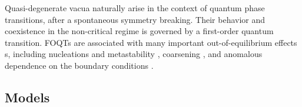 Quasi-degenerate vacua naturally arise in the context of quantum phase transitions, after a spontaneous symmetry breaking. Their behavior and coexistence in the non-critical regime is governed by a first-order quantum transition.
FOQTs are associated with many important out-of-equilibrium effects s, including nucleations and metastability \cite{binder1987theory,bray2002theory}, coarsening \cite{chandran2012kibble}, and anomalous dependence on the boundary conditions \cite{pelissetto2020scaling,panagopoulos2018dynamic,campostrini2015quantum,pelissetto2018finite,rossini2018ground}.

\subsection{Models}



